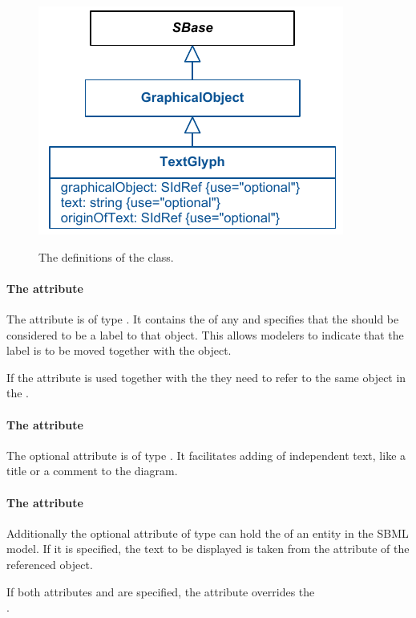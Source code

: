 \begin{figure}[!h]
\includegraphics{uml/layout-textglyph-uml}\\
\caption{The definitions of the \TextGlyph class.}
\label{uml:textglyph}
\end{figure}

\paragraph{The  attribute}
The attribute  is of type . It 
contains the  of any \GraphicalObject and specifies that the 
\TextGlyph should be considered to be a label to that object. This 
allows modelers to indicate that the label is to be moved together with the 
object. 

If the  attribute is used together with the  
they need to refer to the same object in the \LayoutClass.

\paragraph{The  attribute}
The optional  attribute is of type . It 
facilitates adding of independent text, like a title or a comment to the 
diagram. 

\paragraph{The  attribute}
Additionally the optional attribute  of type 
 can hold the  of an entity in the SBML 
model. If it is specified, the text to be displayed is taken from the 
 attribute of the referenced object. 

If both attributes  and  are specified, 
the  attribute overrides the \\ . 


